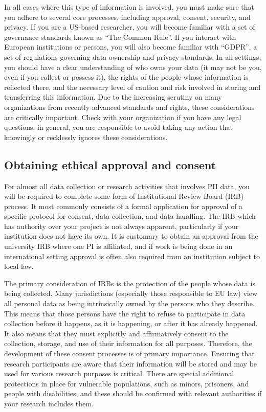 In all cases where this type of information is involved,
you must make sure that you adhere to several core processes,
including approval, consent, security, and privacy.
If you are a US-based researcher, you will become familiar
with a set of governance standards known as ``The Common Rule''.
If you interact with European institutions or persons,
you will also become familiar with ``GDPR'',
a set of regulations governing data ownership and privacy standards.
In all settings, you should have a clear understanding of
who owns your data (it may not be you, even if you collect or possess it),
the rights of the people whose information is reflected there,
and the necessary level of caution and risk involved in
storing and transferring this information.
Due to the increasing scrutiny on many organizations
from recently advanced standards and rights,
these considerations are critically important.
Check with your organization if you have any legal questions;
in general, you are responsible to avoid taking any action that
knowingly or recklessly ignores these considerations.

\subsection{Obtaining ethical approval and consent}

For almost all data collection or research activities that involves PII data,
you will be required to complete some form of Institutional Review Board (IRB) process.
It most commonly consists of a formal application for approval of a specific
protocol for consent, data collection, and data handling.
The IRB which has authority over your project is not always apparent,
particularly if your institution does not have its own.
It is customary to obtain an approval from the university IRB where one PI is affiliated,
and if work is being done in an international setting approval is often also required
from an institution subject to local law.

The primary consideration of IRBs is the protection of the people whose data is being collected.
Many jurisdictions (especially those responsible to EU law) view all personal data
as being intrinsically owned by the persons who they describe.
This means that those persons have the right to refuse to participate in data collection
before it happens, as it is happening, or after it has already happened.
It also means that they must explicitly and affirmatively consent
to the collection, storage, and use of their information for all purposes.
Therefore, the development of these consent processes is of primary importance.
Ensuring that research participants are aware that their information
will be stored and may be used for various research purposes is critical.
There are special additional protections in place for vulnerable populations,
such as minors, prisoners, and people with disabilities,
and these should be confirmed with relevant authorities if your research includes them.

